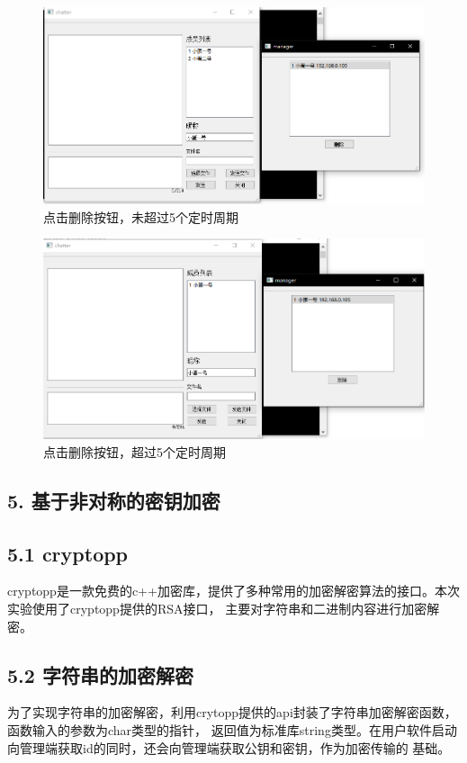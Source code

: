 \documentclass[UTF8]{ctexart}
\begin{document}
\begin{figure}[H]
\includegraphics[width=\textwidth]{pic/deleteuser1.PNG}
\caption{点击删除按钮，未超过5个定时周期}
\end{figure}

\begin{figure}[H]
\includegraphics[width=\textwidth]{pic/deleteuser2.PNG}
\caption{点击删除按钮，超过5个定时周期}
\end{figure}

\subsection*{\textbf{5. 基于非对称的密钥加密}}
\subsection*{5.1 cryptopp}
cryptopp是一款免费的c++加密库，提供了多种常用的加密解密算法的接口。本次实验使用了cryptopp提供的RSA接口，
主要对字符串和二进制内容进行加密解密。

\subsection*{5.2 字符串的加密解密}
为了实现字符串的加密解密，利用crytopp提供的api封装了字符串加密解密函数，函数输入的参数为char类型的指针，
返回值为标准库string类型。在用户软件启动向管理端获取id的同时，还会向管理端获取公钥和密钥，作为加密传输的
基础。
\end{document}
